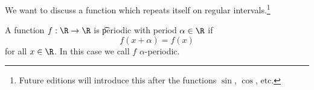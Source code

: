 

We want to discuss a function which repeats itself on regular intervals.\footnote{Future editions will introduce this after the functions $\sin$, $\cos$, etc.}


A function $f: \R \to \R$ is \t{periodic with period} $\alpha \in \R$ if
\[
  f(x + \alpha) = f(x)
\]
for all $x \in \R$.
In this case we call $f$ \t{$\alpha$-periodic}.

\blankpage

